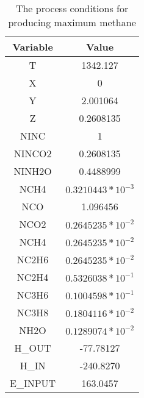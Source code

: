 \documentclass[journal=iecred,manuscript=article]{achemso}
\begin{document}
\FloatBarrier
\begin{table}[H]
\caption{The process conditions for producing maximum methane} 
\centering
\begin{tabular}{|c|c|}
\hline\hline %
Variable & Value \\ 
[1ex] %
\hline %
T	& 1342.127 \\
\hline
X	 & 0 \\
\hline
Y	& 2.001064 \\
\hline
Z	&  0.2608135 \\
\hline
NINC	& 1 \\
\hline
NINCO2	& 0.2608135 \\
\hline
NINH2O	& 0.4488999 \\
\hline
NCH4 &	$0.3210443*10^{-3}$ \\
\hline
NCO	& 1.096456 \\
\hline
NCO2	& $0.2645235*10^{-2}$ \\
\hline
NCH4	& $0.2645235*10^{-2}$ \\
\hline
NC2H6	& $0.2645235*10^{-2}$ \\
\hline
NC2H4	& $0.5326038*10^{-1}$ \\
\hline
NC3H6	& $0.1004598*10^{-1}$ \\
\hline
NC3H8	& $0.1804116*10^{-2}$ \\
\hline
NH2O	& $0.1289074*10^{-2}$ \\
\hline
H_{OUT}	& -77.78127 \\
\hline
H_{IN}	& -240.8270 \\
\hline
E_{INPUT}	& 163.0457 \\
\hline 

\end{tabular}
\end{table}
\FloatBarrier

\newpage
\end{document}
